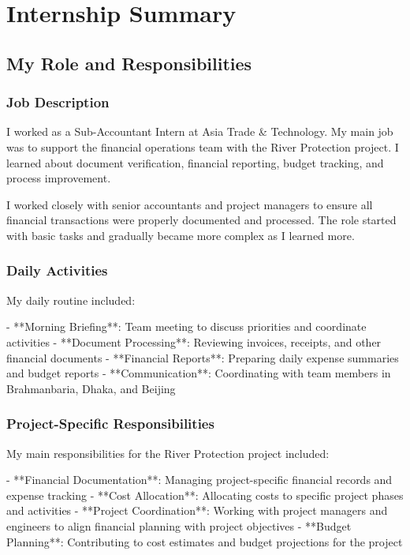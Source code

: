 
\chapter{Internship Summary}

\section{My Role and Responsibilities}

\subsection{Job Description}
I worked as a Sub-Accountant Intern at Asia Trade \& Technology. My main job was to support the financial operations team with the River Protection project. I learned about document verification, financial reporting, budget tracking, and process improvement.

I worked closely with senior accountants and project managers to ensure all financial transactions were properly documented and processed. The role started with basic tasks and gradually became more complex as I learned more.

\subsection{Daily Activities}
My daily routine included:

- **Morning Briefing**: Team meeting to discuss priorities and coordinate activities
- **Document Processing**: Reviewing invoices, receipts, and other financial documents
- **Financial Reports**: Preparing daily expense summaries and budget reports
- **Communication**: Coordinating with team members in Brahmanbaria, Dhaka, and Beijing

\subsection{Project-Specific Responsibilities}
My main responsibilities for the River Protection project included:

- **Financial Documentation**: Managing project-specific financial records and expense tracking
- **Cost Allocation**: Allocating costs to specific project phases and activities
- **Project Coordination**: Working with project managers and engineers to align financial planning with project objectives
- **Budget Planning**: Contributing to cost estimates and budget projections for the project

